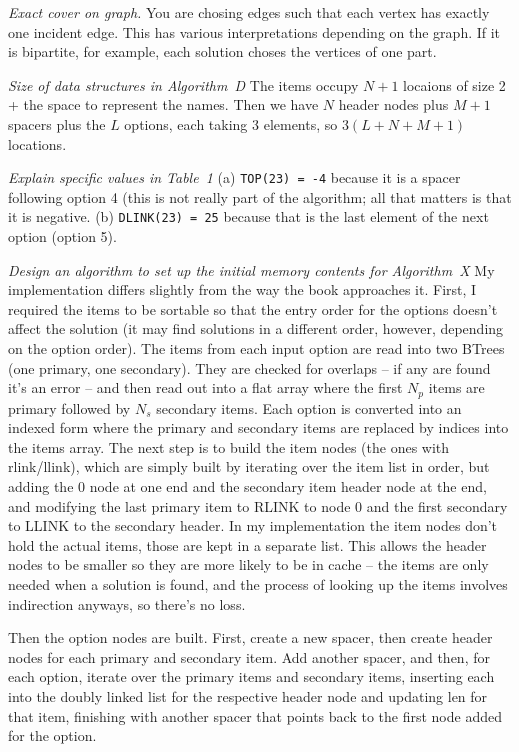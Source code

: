  {\it Exact cover on graph.}\hfil\break
You are chosing edges such that each vertex has exactly one incident edge.
This has various interpretations depending on the graph.  If it is bipartite, for
example, each solution choses the vertices of one part.

 {\it Size of data structures in Algorithm~D}\hfil\break
The items occupy $N+1$ locaions of size 2 + the space to represent the names.
Then we have $N$ header nodes plus $M+1$ spacers plus the $L$ options,
each taking 3 elements, so $3\left(L + N + M + 1\right)$ locations.

 {\it Explain specific values in Table~1}\hfil\break
(a) {\tt TOP(23) = -4} because it is a spacer following option 4 (this is not
really part of the algorithm; all that matters is that it is negative.\hfil\break
(b) {\tt DLINK(23) = 25} because that is the last element of the next option
(option 5).

 {\it Design an algorithm to set up the initial memory
contents for Algorithm~X}\hfil\break
My implementation differs slightly from the way the book approaches it.  First,
I required the items to be sortable so that the entry order for the options
doesn't affect the solution (it may find solutions in a different order, 
however, depending on the option order).  The items from each input option
are read into two BTrees (one primary, one secondary).  They are checked for
overlaps -- if any are found it's an error -- and then read out into a flat
array where the first $N_p$ items are primary followed by $N_s$ secondary items.
Each option is converted into an indexed form where the primary and secondary
items are replaced by indices into the items array.  The next step is to
build the item nodes (the ones with rlink/llink), which are simply built
by iterating over the item list in order, but adding the 0 node at one end
and the secondary item header node at the end, and modifying the last primary
item to RLINK to node 0 and the first secondary to LLINK to the secondary
header.  In my implementation the item nodes don't hold the actual items,
those are kept in a separate list.  This allows the header nodes to be smaller
so they are more likely to be in cache -- the items are only needed when a
solution is found, and the process of looking up the items involves indirection
anyways, so there's no loss.

Then the option nodes are built.  First, create a new spacer, then create 
header nodes for each primary and secondary item.  Add another spacer, and then,
for each option, iterate over the primary items and secondary items,
inserting each into the doubly linked list for the respective header node
and updating len for that item, finishing with another spacer that points back 
to the first node added for the option.

